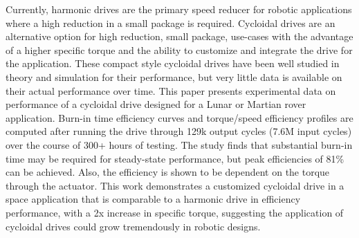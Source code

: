 Currently, harmonic drives are the primary speed reducer for robotic applications where a high reduction in a small package is required. 
Cycloidal drives are an alternative option for high reduction, small package, use-cases with the advantage of a higher specific torque and the ability to customize and integrate the drive for the application.
These compact style cycloidal drives have been well studied in theory and simulation for their performance, but very little data is available on their actual performance over time. 
This paper presents experimental data on performance of a cycloidal drive designed for a Lunar or Martian rover application. 
Burn-in time efficiency curves and torque/speed efficiency profiles are computed after running the drive through 129k output cycles (7.6M input cycles) over the course of 300+ hours of testing. 
The study finds that substantial burn-in time may be required for steady-state performance, but peak efficiencies of 81\% can be achieved. 
Also, the efficiency is shown to be dependent on the torque through the actuator.
This work demonstrates a customized cycloidal drive in a space application that is comparable to a harmonic drive in efficiency performance, with a 2x increase in specific torque, suggesting the application of cycloidal drives could grow tremendously in robotic designs. 
